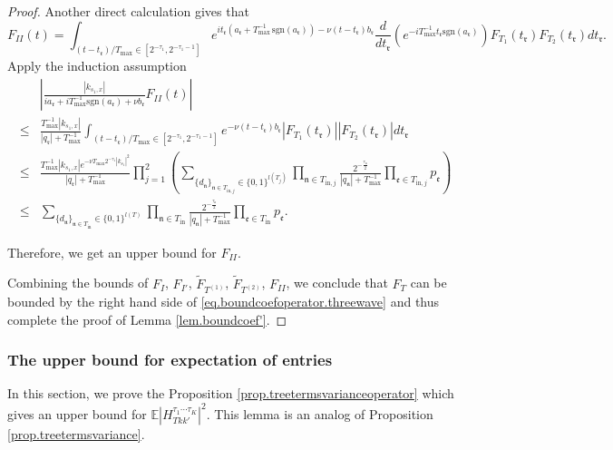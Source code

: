 \begin{proof}
Another direct calculation gives that 
\begin{equation}
    F_{II}(t)=\int_{(t-t_{\mathfrak{r}})/T_{\text{max}}\in [2^{-\tau_{1}},2^{-\tau_{1}-1}]}  e^{it_{\mathfrak{r}}(a_{\mathfrak{r}}+T^{-1}_{\text{max}}\, \text{sgn}(a_{\mathfrak{r}}))- \nu(t-t_{\mathfrak{r}})b_{\mathfrak{r}}} \frac{d}{dt_{\mathfrak{r}}}(e^{-iT^{-1}_{\text{max}}t_{\mathfrak{r}} \text{sgn}(a_{\mathfrak{r}})})  F_{T_1}(t_{\mathfrak{r}})F_{T_2}(t_{\mathfrak{r}}) dt_{\mathfrak{r}}.
\end{equation}
Apply the induction assumption
\begin{equation}
\begin{split}
    &\left| \frac{|k_{s_1,x}|}{ia_{\mathfrak{r}}+iT^{-1}_{\text{max}} \text{sgn}(a_{\mathfrak{r}})+\nu b_{\mathfrak{r}} } F_{II}(t)\right|
    \\
    \le &\frac{T^{-1}_{\text{max}}|k_{s_1,x}|}{|q_{\mathfrak{r}}|+T^{-1}_{\text{max}}}\int_{(t-t_{\mathfrak{r}})/T_{\text{max}}\in [2^{-\tau_{1}},2^{-\tau_{1}-1}]}  e^{- \nu(t-t_{\mathfrak{r}})b_{\mathfrak{r}}}   |F_{T_1}(t_{\mathfrak{r}})| |F_{T_2}(t_{\mathfrak{r}})| dt_{\mathfrak{r}}
    \\
    \le& \frac{T^{-1}_{\text{max}} |k_{s_1,x}| e^{- \nu T_{\text{max}} 2^{-\tau_{1}}|k_{s_1}|^2}}{|q_{\mathfrak{r}}|+T^{-1}_{\text{max}}}\prod_{j=1}^2\left(\sum_{\{d_{\mathfrak{n}}\}_{\mathfrak{n}\in T_{\text{in},j}}\in\{0,1\}^{l(T_j)}}\prod_{\mathfrak{n}\in T_{\text{in},j}}\frac{2^{-\frac{\tau_{\mathfrak{n}}}{2}}}{|q_{\mathfrak{n}}|+T^{-1}_{\text{max}}}\prod_{\mathfrak{e}\in T_{\text{in},j}} p_{\mathfrak{e}}\right)
    \\
    \le& \sum_{\{d_{\mathfrak{n}}\}_{\mathfrak{n}\in T_{\text{in}}}\in\{0,1\}^{l(T)}}\prod_{\mathfrak{n}\in T_{\text{in}}}\frac{2^{-\frac{\tau_{\mathfrak{n}}}{2}}}{|q_{\mathfrak{n}}|+T^{-1}_{\text{max}}}\prod_{\mathfrak{e}\in T_{\text{in}}} p_{\mathfrak{e}}.
\end{split}
\end{equation}

Therefore, we get an upper bound for $F_{II}$.

Combining the bounds of $F_{I}$, $F_{I'}$, $\widetilde{F}_{T^{(1)}}$, $\widetilde{F}_{T^{(2)}}$, $F_{II}$, we conclude that $F_T$ can be bounded by the right hand side of \eqref{eq.boundcoefoperator.threewave} and thus complete the proof of Lemma \ref{lem.boundcoef'}.
\end{proof}

\subsubsection{The upper bound for expectation of entries} In this section, we prove the Proposition \ref{prop.treetermsvarianceoperator} which gives an upper bound for $\mathbb{E}|H^{\tau_1\cdots \tau_{K}}_{Tkk'}|^2$. This lemma is an analog of Proposition \ref{prop.treetermsvariance}.

